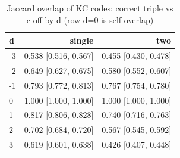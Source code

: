\begin{table}[t]
\centering
\small
\begin{tabular}{lrr}
\toprule
d & single & two \\
\midrule
-3 & 0.538 [0.516, 0.567] & 0.455 [0.430, 0.478] \\
-2 & 0.649 [0.627, 0.675] & 0.580 [0.552, 0.607] \\
-1 & 0.793 [0.772, 0.813] & 0.767 [0.754, 0.780] \\
0 & 1.000 [1.000, 1.000] & 1.000 [1.000, 1.000] \\
1 & 0.817 [0.806, 0.828] & 0.740 [0.716, 0.763] \\
2 & 0.702 [0.684, 0.720] & 0.567 [0.545, 0.592] \\
3 & 0.619 [0.601, 0.638] & 0.426 [0.407, 0.448] \\
\bottomrule
\end{tabular}
\caption{Jaccard overlap of KC codes: correct triple vs c off by d (row d=0 is self-overlap)}
\label{tab:addition_kc_overlap}
\end{table}